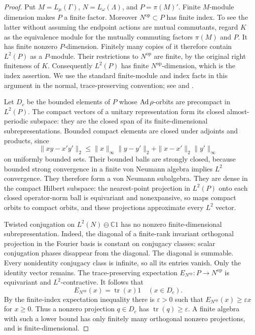 \begin{proof}
Put $M=L_\mu(\Gamma)$, $N=L_\omega(\Lambda)$, and
$P=\pi(M)'$.  Finite $M$-module dimension makes $P$ a finite factor.
Moreover $N^{\mathrm{op}}\subset P$ has finite index.  To see the
latter without assuming the endpoint actions are mutual commutants,
regard $K$ as the equivalence module for the mutually commuting factors
$\pi(M)$ and $P$.  It has finite nonzero $P$-dimension.  Finitely many
copies of it therefore contain $L^2(P)$ as a $P$-module.  Their
restrictions to $N^{\mathrm{op}}$ are finite, by the original right
finiteness of $K$.  Consequently $L^2(P)$ has finite
$N^{\mathrm{op}}$-dimension, which is the index assertion.  We use
the standard finite-module and index facts in this argument in the
normal, trace-preserving convention; see
\cite{Jones1983} and \cite[Proposition~2.1]{PimsnerPopa1986}.

Let $D_c$ be the bounded elements of $P$ whose $\operatorname{Ad}\rho$-orbits are
precompact in $L^2(P)$.  The compact vectors of a unitary representation
form its closed almost-periodic subspace: they are the closed span of
its finite-dimensional subrepresentations.  Bounded compact elements
are closed under adjoints and products, since
\[
 \|xy-x'y'\|_2
 \leq \|x\|_\infty\|y-y'\|_2
       +\|x-x'\|_2\|y'\|_\infty
\]
on uniformly bounded sets.  Their bounded balls are strongly closed,
because bounded strong convergence in a finite von Neumann algebra
implies $L^2$ convergence.  They therefore form a von Neumann
subalgebra.  They are dense in the compact Hilbert subspace: the
nearest-point projection in $L^2(P)$ onto each closed operator-norm
ball is equivariant and nonexpansive, so maps compact orbits to compact
orbits, and these projections approximate every $L^2$ vector.

Twisted conjugation on $L^2(N)\ominus\mathbb C1$ has no nonzero
finite-dimensional subrepresentation.  Indeed, the diagonal of a
finite-rank invariant orthogonal projection in the Fourier basis is
constant on conjugacy classes: scalar conjugation phases disappear
from the diagonal.  The diagonal is summable.  Every nonidentity
conjugacy class is infinite, so all its entries vanish.  Only the
identity vector remains.  The trace-preserving expectation
$E_{N^{\mathrm{op}}}:P\to N^{\mathrm{op}}$ is equivariant and
$L^2$-contractive.  It follows that
\[
 E_{N^{\mathrm{op}}}(x)=\operatorname{tr}(x)1
             \quad(x\in D_c).
\]
By the finite-index expectation inequality there is $\varepsilon>0$
such that $E_{N^{\mathrm{op}}}(x)\geq\varepsilon x$ for $x\geq0$.
Thus a nonzero projection $q\in D_c$ has
$\operatorname{tr}(q)\geq\varepsilon$.  A finite algebra with such a
lower bound has only finitely many orthogonal nonzero projections,
and is finite-dimensional.


\end{proof}
